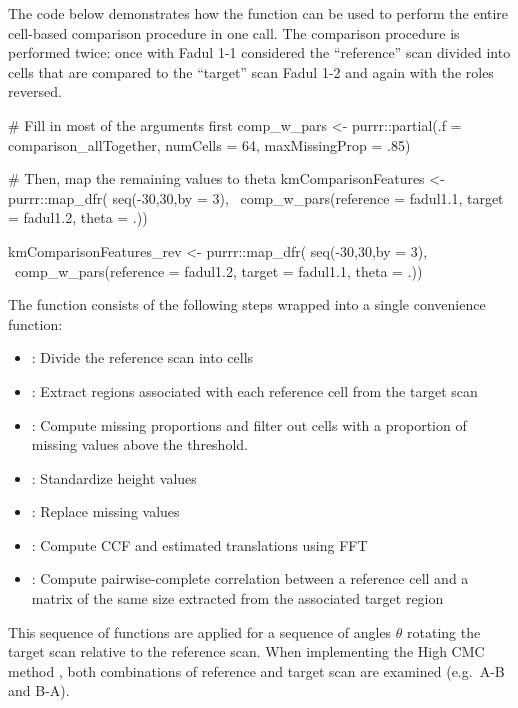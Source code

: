 The code below demonstrates how the 
function can be used to perform the entire cell-based comparison
procedure in one call. The comparison procedure is performed twice: once
with Fadul 1-1 considered the ``reference'' scan divided into cells that
are compared to the ``target'' scan Fadul 1-2 and again with the roles
reversed.

\begin{Schunk}
\begin{Sinput}
# Fill in most of the arguments first
comp_w_pars <- purrr::partial(.f = comparison_allTogether, 
                               numCells = 64, maxMissingProp = .85)

# Then, map the remaining values to theta
kmComparisonFeatures <- purrr::map_dfr(
  seq(-30,30,by = 3), 
  ~comp_w_pars(reference = fadul1.1, target = fadul1.2, theta = .))

kmComparisonFeatures_rev <- purrr::map_dfr(
  seq(-30,30,by = 3), 
  ~comp_w_pars(reference = fadul1.2, target = fadul1.1, theta = .))
\end{Sinput}
\end{Schunk}

The  function consists of the following
steps wrapped into a single convenience function:

\begin{itemize}
\tightlist
\item
  : Divide the reference scan into cells
\item
  : Extract regions associated with
  each reference cell from the target scan
\item
  : Compute missing proportions and
  filter out cells with a proportion of missing values above the
  threshold.
\item
  : Standardize height values
\item
  : Replace missing values
\item
  : Compute CCF and estimated translations
  using FFT
\item
  : Compute pairwise-complete correlation between
  a reference cell and a matrix of the same size extracted from the
  associated target region
\end{itemize}

This sequence of functions are applied for a sequence of angles
\(\theta\) rotating the target scan relative to the reference scan. When
implementing the High CMC method \citep{tong_improved_2015}, both
combinations of reference and target scan are examined (e.g.~A-B and
B-A).

